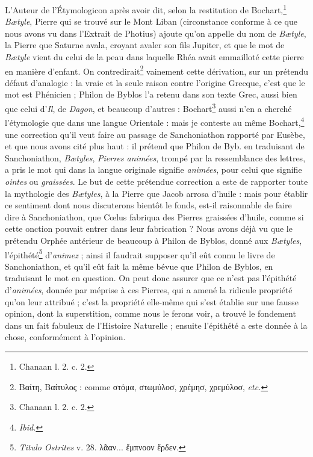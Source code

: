 \documentclass[a4paper, 11pt, oneside, polutonikogreek, french]{article}
\begin{document}
L'Auteur de l'Étymologicon après avoir dit, selon la restitution de Bochart,\footnote{Chanaan l. 2. c. 2.} \emph{Bætyle}, Pierre qui se trouvé sur le Mont Liban (circonstance conforme à ce que nous avons vu dans l'Extrait de Photius) ajoute qu'on appelle du nom de \emph{Bætyle}, la Pierre que Saturne avala, croyant avaler son fils Jupiter, et que le mot de \emph{Bætyle} vient du celui de la peau dans laquelle Rhéa avait emmailloté cette pierre en manière d'enfant. On contredirait\footnote{Βαίτη, Βαίτυλος : comme στὀμα, στωμύλοσ, χρέμησ, χρεμύλοσ, \emph{etc.}} vainement cette dérivation, sur un prétendu défaut d'analogie : la vraie et la seule raison contre l'origine Grecque, c'est que le mot est Phénicien ; Philon de Byblos l'a retenu dans son texte Grec, aussi bien que celui d'\emph{Il}, de \emph{Dagon}, et beaucoup d'autres : Bochart\footnote{Chanaan l. 2. c. 2.} aussi n'en a cherché l'étymologie que dans une langue Orientale : mais je conteste au même Bochart,\footnote{\emph{Ibid.}} une correction qu'il veut faire au passage de Sanchoniathon rapporté par Eusèbe, et que nous avons cité plus haut : il prétend que Philon de Byb. en traduisant de Sanchoniathon, \emph{Bætyles}, \emph{Pierres animées}, trompé par la ressemblance des lettres, a pris le mot qui dans la langue originale signifie \emph{animées}, pour celui que signifie \emph{ointes} ou \emph{graissées}. Le but de cette prétendue correction a este de rapporter toute la mythologie des \emph{Bætyles}, à la Pierre que Jacob arrosa d'huile : mais pour établir ce sentiment dont nous discuterons bientôt le fonds, est-il raisonnable de faire dire à Sanchoniathon, que Cœlus fabriqua des Pierres graissées d'huile, comme si cette onction pouvait entrer dans leur fabrication ? Nous avons déjà vu que le prétendu Orphée antérieur de beaucoup à Philon de Byblos, donné aux \emph{Bætyles}, l'épithété\footnote{\emph{Titulo Ostrites} v. 28. λᾶαν... ἔμπνοον ἔρδεν.} d'\emph{animez} ; ainsi il faudrait supposer qu'il eût connu le livre de Sanchoniathon, et qu'il eût fait la même bévue que Philon de Byblos, en traduisant le mot en question. On peut donc assurer que ce n'est pas l'épithété d'\emph{animées}, donnée par méprise à ces Pierres, qui a amené la ridicule propriété qu'on leur attribué ; c'est la propriété elle-même qui s'est établie sur une fausse opinion, dont la superstition, comme nous le ferons voir, a trouvé le fondement dans un fait fabuleux de l'Histoire Naturelle ; ensuite l'épithété a este donnée à la chose, conformément à l'opinion.
\end{document}
